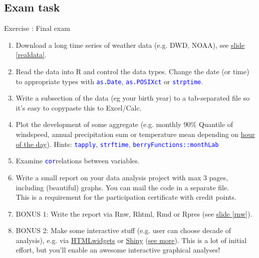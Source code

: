 \documentclass[xcolor=table,       handout,    xcolor=dvipsnames]{beamer}\usepackage[]{graphicx}\usepackage[]{color}
\newcounter{exercisecount}
\newenvironment{exercise}[1]
{%
\stepcounter{exercisecount}
\begin{block}{Exercise \arabic{exercisecount}: #1}
}
{%
\end{block} }
\newcommand{\rcode}[1]{\texttt{\textcolor{Blue}{#1}}} %
\begin{document}
\subsection{Exam task}

\begin{frame}
\begin{exercise}{Final exam} %
{\footnotesize
\begin{enumerate}
  \item Download a long time series of weather data (e.g. DWD, NOAA), see \hyperlink{realdata}{slide \ref{realdata}}.
  \item Read the data into R and control the data types. Change the date (or time) to appropriate types with \rcode{as.Date}, \rcode{as.POSIXct} or \rcode{strptime}.
  \item Write a subsection of the data (eg your birth year) to a tab-separated file so it's easy to copypaste this to Excel/Calc.
  \item Plot the development of some aggregate (e.g. monthly 90\% Quantile of windspeed, annual precipitation sum or temperature mean depending on \href{ftp://ftp-cdc.dwd.de/pub/CDC/observations_germany/climate/hourly/}{hour of the day}).
  Hints: \rcode{tapply}, \rcode{strftime}, \rcode{berryFunctions::monthLab}
  \item Examine \rcode{cor}relations between variables.
  \item Write a small report on your data analysis project with max 3 pages, including (beautiful) graphs. You can mail the code in a separate file.\\
  \alert{This is a requirement for the participation certificate with credit points.}
  \item BONUS 1: Write the report via Rnw, Rhtml, Rmd or Rpres (see \hyperlink{rnw}{slide \ref{rnw}}).
  \item BONUS 2: Make some interactive stuff (e.g. user can choose decade of analysis), e.g. via \href{http://www.htmlwidgets.org}{HTMLwidgets} or \href{http://shiny.rstudio.com}{Shiny} (\href{http://biostatistics.dk/useR/IntGraph.html\#1}{see more}). This is a lot of initial effort, but you'll enable an awesome interactive graphical analyses!
\end{enumerate}
}
\end{exercise}
\end{frame}

\end{document}
